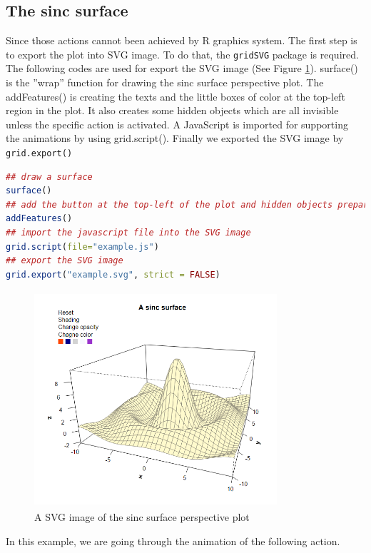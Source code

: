 \documentclass[11pt]{report}
\begin{document}
\subsection{The sinc surface}
Since those actions cannot been achieved by R graphics system. The first step is to export the plot into
SVG image. To do that, the \texttt{gridSVG} package is required. The following codes are used for export the SVG image (See Figure \ref{Example_6.3.01}). surface() is the ''wrap'' function for drawing the sinc surface perspective plot.
The addFeatures() is creating the texts and the little boxes of color at the top-left region in the plot.
It also creates some hidden objects which are all invisible unless the specific action is activated. A
JavaScript is imported for supporting the animations by using grid.script(). Finally we exported
the SVG image by \texttt{grid.export()}\\
\begin{lstlisting}[language = R]
## draw a surface
surface()  
## add the button at the top-left of the plot and hidden objects prepare for animation
addFeatures() 
## import the javascript file into the SVG image
grid.script(file="example.js") 
## export the SVG image
grid.export("example.svg", strict = FALSE) 
\end{lstlisting}
\begin{figure}[h]
	\begin{center}
		\includegraphics[height = 8cm, width = 9cm]{figure/svg/origin_1.PNG}
		\caption{A SVG image of the sinc surface perspective plot}
		\label{Example_6.3.01}
	\end{center}
\end{figure}



\newpage
In this example, we are going through the animation of the following action. 
\end{document}
